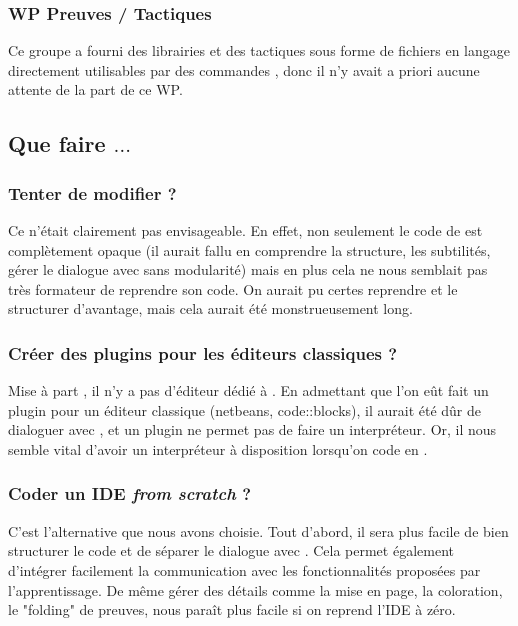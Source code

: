 		\subsubsection{WP Preuves / Tactiques}
			Ce groupe a fourni des librairies et des tactiques sous forme de fichiers en langage \coq{} directement utilisables par des commandes \coq{}, donc il n'y avait a priori aucune attente de la part de ce WP.

    \subsection{Que faire $\ldots$}

        \subsubsection{Tenter de modifier \coqide{} ?}

            Ce n'était clairement pas envisageable.
            En effet, non seulement le code de \coqide{} est complètement opaque (il aurait fallu en comprendre la structure, les subtilités, gérer le dialogue avec \coq{} sans modularité) mais en plus cela ne nous semblait pas très formateur de reprendre son code.
            On aurait pu certes reprendre \coqide{} et le structurer d'avantage, mais cela aurait été monstrueusement long.
			
        \subsubsection{Créer des plugins pour les éditeurs classiques ?}

			Mise à part \coqide{}, il n'y a pas d'éditeur dédié à \coq{}. En admettant que l'on eût fait un plugin pour un éditeur classique (netbeans, code::blocks), il aurait été dûr de dialoguer avec \coqtop{}, et un plugin ne permet pas de faire un interpréteur. Or, il nous semble vital d'avoir un interpréteur à disposition lorsqu'on code en \coq{}.
			
        \subsubsection{Coder un IDE \textit{from scratch} ?}
        
			C'est l'alternative que nous avons choisie. 
			Tout d'abord, il sera plus facile de bien structurer le code et de séparer le dialogue avec \coq{}.
			Cela permet également d'intégrer facilement la communication avec les fonctionnalités proposées par l'apprentissage.
			De même gérer des détails comme la mise en page, la coloration, le "folding" de preuves, nous paraît plus facile si on reprend l'IDE à zéro.
			
